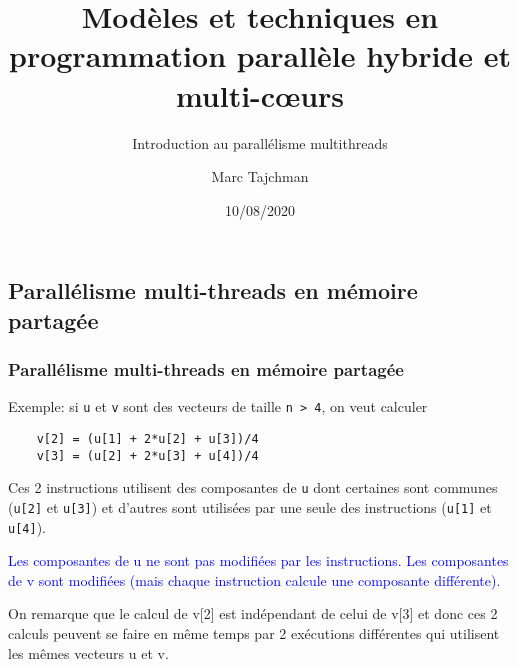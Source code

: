 \documentclass{beamer}
\title{Modèles et techniques en programmation parallèle hybride et multi-c\oe urs}
\subtitle{Introduction au parall\'elisme multithreads}
\author{Marc Tajchman}\institute{CEA - DEN/DM2S/STMF/LMES}
\date{10/08/2020}
\begin{document}
\begin{frame}
	\titlepage
\end{frame}

\large
\begin{frame}[fragile]
	\section{Parallélisme multi-threads en mémoire partagée}
	\frametitle{Parallélisme multi-threads en mémoire partagée}
	
	Exemple: si \verb|u| et \verb|v| sont des vecteurs de taille \verb|n > 4|, on veut calculer
	\begin{lstlisting}
	v[2] = (u[1] + 2*u[2] + u[3])/4
	v[3] = (u[2] + 2*u[3] + u[4])/4
	\end{lstlisting}
	
	\vfill
	Ces 2 instructions utilisent des composantes de \verb|u| dont certaines sont communes (\verb|u[2]| et \verb|u[3]|) et d'autres sont utilisées par une seule des instructions (\verb|u[1]| et \verb|u[4]|).
	
	\vfill
	\textcolor{blue}{Les composantes de u ne sont pas modifiées par les instructions.
	Les composantes de v sont modifiées (mais chaque instruction calcule une composante différente).}
	
	\vfill
	On remarque que le calcul de v[2] est indépendant de celui de v[3] et donc ces 2 calculs peuvent se faire en même temps par 2 ex\'ecutions différentes qui utilisent les mêmes vecteurs u et v.
		
\end{frame}
\end{document}
